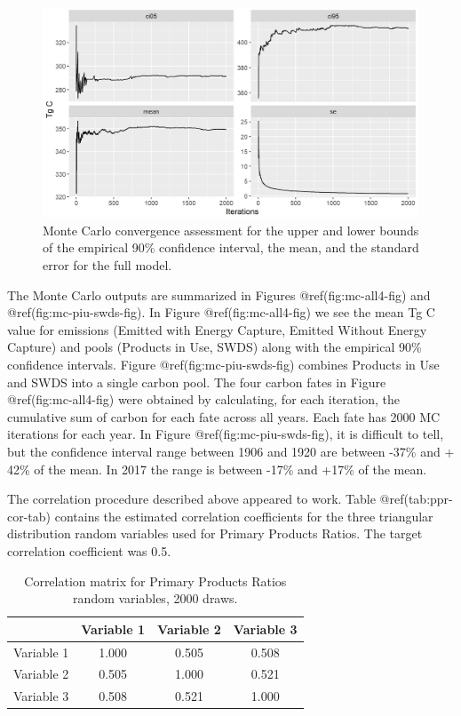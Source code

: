 \documentclass[
  openany]{book}
\begin{document}
\begin{figure}
\includegraphics[width=1\linewidth]{images/MC_conv} \caption{Monte Carlo convergence assessment for the upper and lower bounds of the empirical 90\% confidence interval, the mean, and the standard error for the full model.}\label{fig:mc-conv-fig}
\end{figure}

The Monte Carlo outputs are summarized in Figures @ref(fig:mc-all4-fig)
and @ref(fig:mc-piu-swds-fig). In Figure @ref(fig:mc-all4-fig) we see
the mean Tg C value for emissions (Emitted with Energy Capture, Emitted
Without Energy Capture) and pools (Products in Use, SWDS) along with the
empirical 90\% confidence intervals. Figure @ref(fig:mc-piu-swds-fig)
combines Products in Use and SWDS into a single carbon pool. The four
carbon fates in Figure @ref(fig:mc-all4-fig) were obtained by
calculating, for each iteration, the cumulative sum of carbon for each
fate across all years. Each fate has 2000 MC iterations for each year.
In Figure @ref(fig:mc-piu-swds-fig), it is difficult to tell, but the
confidence interval range between 1906 and 1920 are between -37\% and +
42\% of the mean. In 2017 the range is between -17\% and +17\% of the
mean.

The correlation procedure described above appeared to work. Table
@ref(tab:ppr-cor-tab) contains the estimated correlation coefficients
for the three triangular distribution random variables used for Primary
Products Ratios. The target correlation coefficient was 0.5.

\begin{table}

\caption{\label{tab:ppr-cor-tab}Correlation matrix for Primary Products Ratios random variables, 2000 draws.}
\centering
\begin{tabular}[t]{lccc}
\toprule
  & Variable 1 & Variable 2 & Variable 3\\
\midrule
Variable 1 & 1.000 & 0.505 & 0.508\\
Variable 2 & 0.505 & 1.000 & 0.521\\
Variable 3 & 0.508 & 0.521 & 1.000\\
\bottomrule
\end{tabular}
\end{table}
\end{document}
